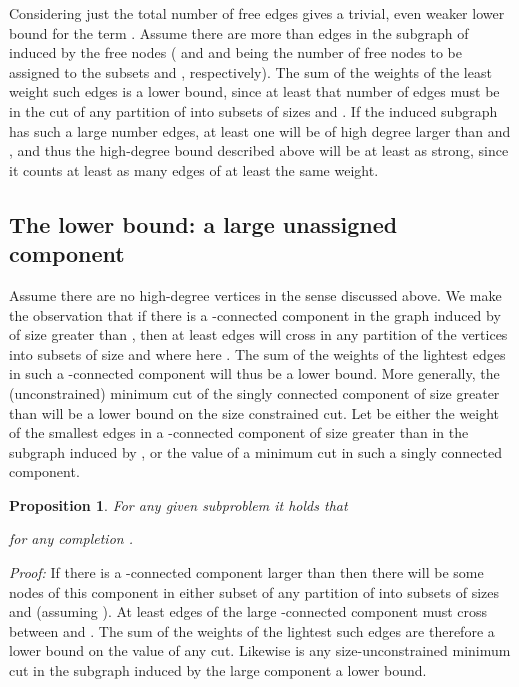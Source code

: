 \documentclass[a4paper,11pt]{article}
\newtheorem{proposition}{Proposition}
\newenvironment{proof}{\emph{Proof:}}{\newline}
\begin{document}
Considering just the total number of free edges gives a trivial, even
weaker lower bound for the term . Assume there are more than  edges in
the subgraph of  induced by the free nodes  ( and and 
being the number of free nodes to be assigned to the subsets  and
, respectively). The sum of the weights of the least weight such
edges is a lower bound, since at least that number of edges must be in
the cut of any partition of  into subsets of sizes  and
. If the induced subgraph has such a large number edges, at least
one will be of high degree larger than  and , and thus the
high-degree bound described above will be at least as strong, since it
counts at least as many edges of at least the same weight.

\subsection{The lower bound: a large unassigned component}
\label{sec:largecomponent}

Assume there are no high-degree vertices in the sense discussed
above. We make the observation that if there is a -connected
component in the graph induced by  of size greater than , then
at least  edges will cross in any partition of the  vertices
into subsets of size  and  where here . The sum
of the weights of the  lightest edges in such a -connected
component will thus be a lower bound. More generally, the
(unconstrained) minimum cut of the singly connected component of size
greater than  will be a lower bound on the size constrained
cut. Let  be either the weight of the  smallest edges
in a -connected component of size greater than  in the
subgraph induced by , or the value of a minimum cut in such a
singly connected component.

\begin{proposition}
  \label{prop:component}
  For any given subproblem  it holds that
  
  for any completion .
\end{proposition}

\begin{proof}
  If there is a -connected component larger than  then there
  will be some nodes of this component in either subset of any partition
  of  into subsets of sizes  and  (assuming ).
  At least  edges of the large -connected component must cross
  between  and . The sum of the weights
  of the lightest such  edges are therefore a lower bound on the
  value of any cut. Likewise is any size-unconstrained minimum cut in
  the subgraph induced by the large component a lower bound.
\end{proof}
\end{document}
